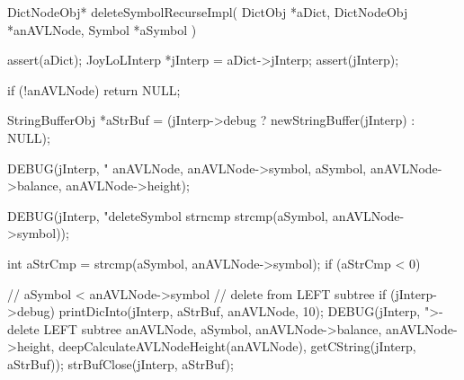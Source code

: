 \startCCode
DictNodeObj* deleteSymbolRecurseImpl(
  DictObj     *aDict,
  DictNodeObj *anAVLNode,
  Symbol      *aSymbol
) {
  assert(aDict);
  JoyLoLInterp *jInterp = aDict->jInterp;
  assert(jInterp);
  
  if (!anAVLNode) return NULL;

  StringBufferObj *aStrBuf = 
    (jInterp->debug ? newStringBuffer(jInterp) : NULL);

  DEBUG(jInterp, "\ndeleteSymbol %
        anAVLNode, anAVLNode->symbol, aSymbol,
        anAVLNode->balance, anAVLNode->height);

  DEBUG(jInterp, "deleteSymbol strncmp %
        strcmp(aSymbol, anAVLNode->symbol));

  int aStrCmp = strcmp(aSymbol, anAVLNode->symbol);
  if (aStrCmp < 0) {
    // aSymbol < anAVLNode->symbol // delete from LEFT subtree
    if (jInterp->debug) {
      printDicInto(jInterp, aStrBuf, anAVLNode, 10);
      DEBUG(jInterp, ">-delete LEFT subtree %
            anAVLNode, aSymbol, anAVLNode->balance,
            anAVLNode->height, deepCalculateAVLNodeHeight(anAVLNode),
            getCString(jInterp, aStrBuf));
      strBufClose(jInterp, aStrBuf);
    }

}}
